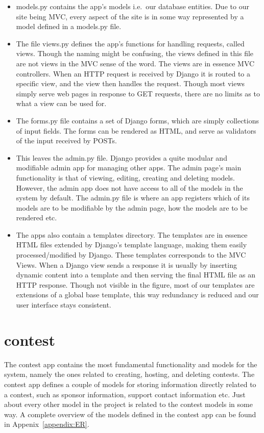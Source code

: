\begin{itemize}
    \item models.py contains the app's models i.e.\ our database entities. Due
        to our site being MVC, every aspect of the site is in some way
        represented by a model defined in a models.py file.

    \item The file views.py defines the app's functions for
    handling requests, called views. Though the naming might be confusing,
    the views defined in this file are not views in the MVC sense of the
    word. The views are in essence MVC controllers. When an HTTP request is
    received by Django it is routed to a specific view, and the view then
    handles the request. Though most views simply serve web pages in
    response to GET requests, there are no limits as to what a view can be
    used for. 

    \item The forms.py file contains a set of Django forms, which are simply
    collections of input fields. The forms can be rendered as HTML, and
    serve as validators of the input received by POSTs. 

    \item This leaves the admin.py file. Django provides a quite modular and
    modifiable admin app for managing other apps. The admin
    page's main functionality is that of viewing, editing,
    creating and deleting models. However, the admin app does not have
    access to all of the models in the system by default. The admin.py file
    is where an app registers which of its models are to be modifiable by
    the admin page, how the models are to be rendered etc.

    \item The apps also contain a templates directory. The templates are in
    essence HTML files extended by Django's template language, making them
    easily processed/modified by Django. These templates corresponds to the MVC
    Views. When a Django view sends a response it is usually by inserting
    dynamic content into a template and then serving the final HTML file as an
    HTTP response. Though not visible in the figure, most of our templates are
    extensions of a global base template, this way redundancy is reduced and
    our user interface stays consistent.
\end{itemize}

\section{contest}
The contest app contains the most fundamental functionality and models for the system,
namely the ones related to creating, hosting, and deleting contests. 
The contest app defines a couple of models
for storing information directly related to a contest, such as sponsor
information, support contact information etc. Just about every
other model in the project is related to the contest models in some way.
A complete overview of the models defined in the contest app can be
found in Appenix~\ref{appendix:ER}.


